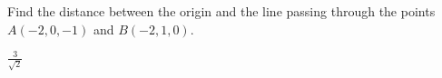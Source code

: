 
\begin{Exercise}[
name={},
title={}, 
difficulty=0,
origin={\cite{BS}}]
Find the distance between the origin and the line passing through the points $A(-2, 0, -1)$ and $B(-2, 1, 0)$.
\end{Exercise}
\begin{Answer}
$\frac{3}{\sqrt{2}}$
\end{Answer}
